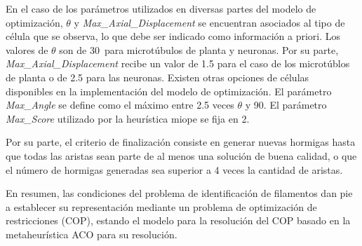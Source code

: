 En el caso de los par\'ametros utilizados en diversas partes del modelo de optimizaci\'on, $\theta$ y {\it Max\_Axial\_Displacement} se encuentran asociados al tipo de c\'elula que se observa, lo que debe ser indicado como informaci\'on a priori. Los valores de $\theta$ son de 30\textdegree ~para microt\'ubulos de planta y neuronas. Por su parte, {\it Max\_Axial\_Displacement} recibe un valor de 1.5 para el caso de los microt\'ublos de planta o de 2.5 para las neuronas. Existen otras opciones de c\'elulas disponibles en la implementaci\'on del modelo de optimizaci\'on. El par\'ametro {\it Max\_Angle} se define como el m\'aximo entre 2.5 veces $\theta$ y 90. El par\'ametro {\it Max\_Score} utilizado por la heur\'istica miope se fija en 2.


Por su parte, el criterio de finalizaci\'on consiste en generar nuevas hormigas hasta que todas las aristas sean parte de al menos una soluci\'on de buena calidad, o que el n\'umero de hormigas generadas sea superior a 4 veces la cantidad de aristas.


En resumen, las condiciones del problema de identificaci\'on de filamentos dan pie a establecer su representaci\'on mediante un problema de optimizaci\'on de restricciones (COP), estando el modelo para la resoluci\'on del COP basado en la metaheur\'istica ACO para su resoluci\'on.